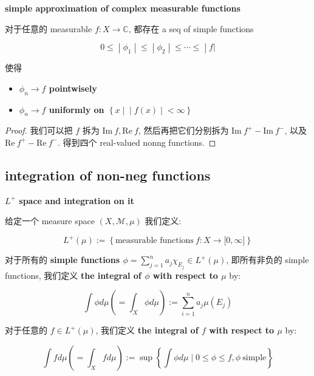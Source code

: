 \documentclass{qlnotes-export}
\begin{document}
\begin{corollary}{\protect{}\label{kn-simple-approximation-of-complex-measurable-functions}{\textbf{simple
approximation of complex measurable functions}}}

对于任意的 measurable \(f:X\rightarrow{\mathbb{C}}\), 都存在 a seq of simple functions

\[\left. 0 \leq \middle| \phi_{1} \middle| \leq \middle| \phi_{2} \middle| \leq \cdots \leq \middle| f| \right.\]

使得

\begin{itemize}
\item
  \textbf{\(\phi_{n}\rightarrow f\) pointwisely}
\item
  \textbf{\(\phi_{n}\rightarrow f\) uniformly on \(\left\{ x \mid \middle| f(x) \middle| < \infty \right\}\)}
\end{itemize}

\end{corollary}

\begin{proof}

我们可以把 \(f\) 拆为 \(\text{Im}\ f,\text{Re}\ f\), 然后再把它们分别拆为 \(\text{Im}\ f^{+} - \text{Im}\ f^{-}\), 以及 \(\text{Re}\ f^{+} - \text{Re}\ f^{-}\). 得到四个 real-valued nonng functions.

\end{proof}

\subsection{integration of non-neg functions}\label{integration-of-non-neg-functions}

\begin{definition}{\protect{}\label{kn-l-space-and-integration-on-it}{\textbf{\(L^{+}\)
space and integration on it}}}

给定一个 measure space \((X,\mathcal{M},\mu)\) 我们定义:

\[L^{+}(\mu) := \left\{ {\text{measurable functions}\ f:X\rightarrow\lbrack 0,\infty\rbrack} \right\}\]

对于所有的 \textbf{simple functions \(\phi = \sum_{j = 1}^{n}a_{j}\chi_{E_{j}} \in L^{+}(\mu)\)}, 即所有非负的 simple functions, 我们定义 \textbf{the integral of \(\phi\) with respect to \(\mu\)} by:

\[\int\phi d\mu( = \int_{X}\phi d\mu) := \sum\limits_{i = 1}^{n}a_{j}\mu(E_{j})\]

对于任意的 \(f \in L^{+}(\mu)\), 我们定义 \textbf{the integral of \(f\) with respect to \(\mu\)} by:

\[\int fd\mu( = \int_{X}fd\mu) := \sup\left\{ {\int\phi d\mu \mid 0 \leq \phi \leq f,\phi\ \text{simple}} \right\}\]

\end{definition}
\end{document}
